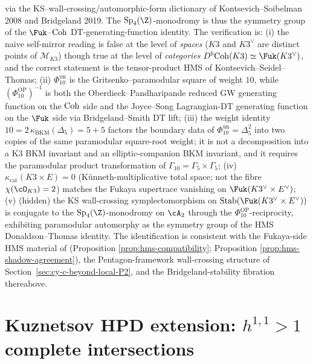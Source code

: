 \begin{remark}
via the KS--wall-crossing/automorphic-form dictionary of
Kontsevich--Soibelman 2008 and Bridgeland 2019. The
$\mathrm{Sp}_4(\Z)$-monodromy is thus the symmetry group of the
$\Fuk$--$\mathrm{Coh}$ DT-generating-function identity. The verification is:
\textup{(i)} the naive self-mirror reading is false at the level of
\emph{spaces} \textup{(}$K3$ and $K3^\vee$ are distinct points of
$\mathcal M_{K3}$\textup{)} though true at the level of
\emph{categories} $D^b\Coh(K3)\simeq\Fuk(K3^\vee)$, and the correct
statement is the tensor-product HMS of Kontsevich--Seidel--Thomas;
\textup{(ii)} \(\Phi_{10}^{\mathrm{un}}\) is the Gritsenko--paramodular
square of weight $10$, while \((\Phi_{10}^{\mathrm{OP}})^{-1}\) is both the Oberdieck--Pandharipande
reduced GW generating function on the $\mathrm{Coh}$ side and the
Joyce--Song Lagrangian-DT generating function on the $\Fuk$ side
via Bridgeland--Smith DT lift;
\textup{(iii)} the weight identity
\(10=2\,\kappa_{\mathrm{BKM}}(\Delta_5)=5+5\) factors the boundary data
of \(\Phi_{10}^{\mathrm{un}}=\Delta_5^2\) into two copies of the same
paramodular square-root weight; it is not a decomposition into a K3 BKM
invariant and an elliptic-companion BKM invariant, and it requires the
paramodular product transformation of \(\Gamma_{10}=\Gamma_5\times\Gamma_5\);
\textup{(iv)} $\kappa_{\mathrm{cat}}(K3\times E)=0$
\textup{(}K\"unneth-multiplicative total space;
not the fibre $\chi(\cO_{K3})=2$\textup{)} matches the Fukaya
supertrace vanishing on $\Fuk(K3^\vee\times E^\vee)$;
\textup{(v)} (hidden) the KS wall-crossing symplectomorphism on
$\mathrm{Stab}(\Fuk(K3^\vee\times E^\vee))$ is conjugate to the
$\mathrm{Sp}_4(\Z)$-monodromy on $\cA_2$ through the
\(\Phi_{10}^{\mathrm{OP}}\)-reciprocity, exhibiting paramodular automorphy as the
symmetry group of the HMS Donaldson--Thomas identity. The
identification is consistent with the Fukaya-side HMS material of
\cite{VolI}
\textup{(}Proposition \ref{prop:hms-compatibility};
Proposition \ref{prop:hms-shadow-agreement}\textup{)},
the Pentagon-framework wall-crossing structure of
Section~\ref{sec:cy-c-beyond-local-P2}, and the Bridgeland-stability
fibration thereabove.
\end{remark}

\section{Kuznetsov HPD extension: \texorpdfstring{$h^{1,1} > 1$}{h-1,1 > 1} complete intersections}
\label{sec:cy-c-beyond-hpd-h11-greater-1}

